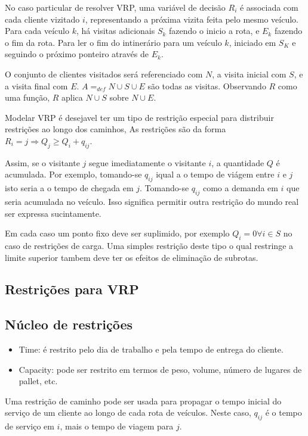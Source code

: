  No caso particular de resolver VRP, uma variável de decisão $R_i$ é associada com cada cliente
vizitado $i$, representando a próxima vizita feita pelo mesmo veículo. Para cada veículo $k$, há
visitas adicionais $S_k$ fazendo o inicio a rota, e $E_k$ fazendo o fim da rota. Para ler o fim do
intinerário para um veículo $k$, iniciado em $S_K$ e seguindo o próximo ponteiro através de $E_k$.

 O conjunto de clientes visitados será referenciado com $N$, a visita inicial com $S$, e a visita
final com $E$. $A =_{def} N\cup S\cup E$ são todas as visitas. Observando $R$ como uma função, $R$
aplica $N\cup S$ sobre $N\cup E$.

 Modelar VRP é desejavel ter um tipo de restrição especial para distribuir restrições ao longo dos
caminhos, As restrições são da forma $R_i = j \Rightarrow Q_j \geq Q_i + q_{ij}.$  

 Assim, se o visitante $j$ segue imediatamente o visitante $i$, a quantidade $Q$ é acumulada. Por
exemplo, tomando-se $q_{ij}$ iqual a o tempo de viágem entre $i$ e $j$ isto seria a o tempo de
chegada em $j$. Tomando-se $q_{ij}$ como a demanda em $i$ que seria acumulada no veículo. Isso
significa permitir outra restrição do mundo real ser expressa sucintamente.

 Em cada caso um ponto fixo deve ser suplimido, por exemplo $Q_i = 0 \forall i\in S$ no caso de
restrições de carga. Uma simples restrição deste tipo o qual restringe a limite superior tambem deve
ter os efeitos de eliminação de subrotas.

\subsection{Restrições para VRP}

\subsection{Núcleo de restrições}

\begin{itemize}
\item Time: é restrito pelo dia de trabalho e pela tempo de entrega do cliente.
\item Capacity: pode ser restrito em termos de peso, volume, número de lugares de pallet, etc.
\end{itemize}


 Uma restrição de caminho pode ser usada para propagar o tempo inicial do serviço de um cliente ao
longo de cada rota de veículos. Neste caso, $q_{ij}$ é o tempo de serviço em $i$, mais o tempo de
viagem para $j$.

